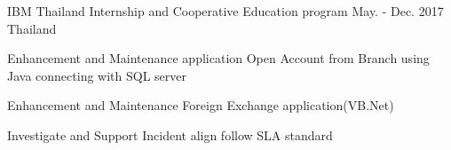 \begin{cventries}
 \cventry
    {IBM Thailand} %
    {Internship and Cooperative Education program} %
    {May. - Dec. 2017} %
    {Thailand} %
    {
      \begin{cvitems} %
        \item {Enhancement and Maintenance application Open Account from Branch using Java connecting with SQL server}
        \item {Enhancement and Maintenance Foreign Exchange application(VB.Net)}
        \item {Investigate and Support Incident align follow SLA standard}
      \end{cvitems}
    }

\end{cventries}
